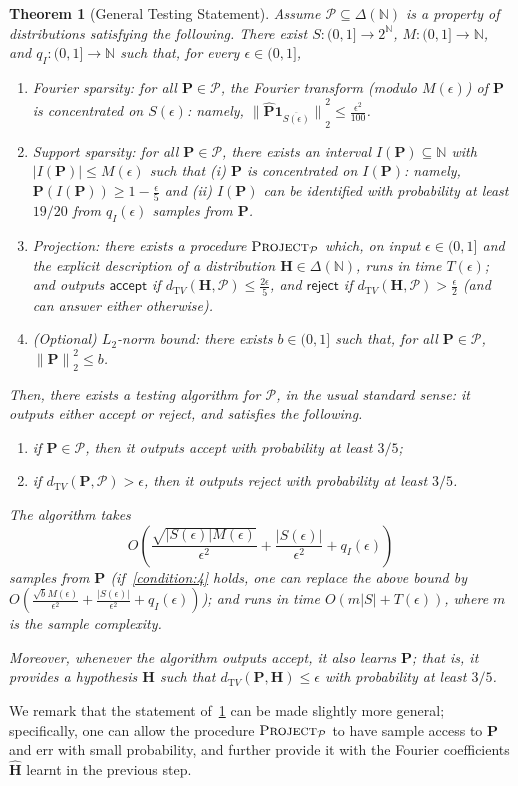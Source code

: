 \documentclass[11pt]{article}
\newtheorem{theorem}{Theorem}[section]
\theoremstyle{definition}
\newcommand{\N}{\mathbb{N}}
\newcommand{\p}{\mathbf{P}}
\newcommand{\h}{\mathbf{H}}
\newcommand{\dtv}{d_{\mathrm TV}}
\newcommand{\eps}{\epsilon}
\newcommand{\abs}[1]{\lvert#1\rvert}
\newcommand{\norm}[1]{\lVert#1\rVert}
\newcommand{\distribs}[1]{\Delta\!\left(#1\right)} \newcommand{\normone}[1]{{\norm{#1}}_1}
\newcommand{\normtwo}[1]{{\norm{#1}}_2}
\renewcommand{\abs}[1]{\left\lvert #1 \right\rvert}
\newcommand{\accept}{\textsf{accept}\xspace}
\newcommand{\reject}{\textsf{reject}\xspace}
\newcommand{\bigO}[1]{{O\left( #1 \right)}}
\newcommand{\fourier}[1]{\widehat{#1}}
\begin{document}
\begin{theorem}[General Testing Statement]\label{theo:testing:general}
Assume $\mathcal{P}\subseteq \distribs{\N}$ is a property of distributions satisfying the following. There exist $S\colon(0,1]\to 2^{\N}$, $M\colon (0,1]\to\N$, and $q_I\colon (0,1]\to\N$ such that, for every $\eps\in(0,1]$,
\begin{enumerate}
  \item\label{condition:1} \textsf{Fourier sparsity:} for all $\p\in\mathcal{P}$, the Fourier transform (modulo $M(\eps)$) of $\p$ is concentrated on $S(\eps)$: namely,
  $
      \normtwo{\fourier{\p}\mathbf{1}_{\overline{S(\eps)}}}^2 \leq \frac{\eps^2}{100}
  $.
  \item\label{condition:2} \textsf{Support sparsity:} for all $\p\in\mathcal{P}$, there exists an interval $I(\p)\subseteq \N$ with $\abs{I(\p)} \leq M(\eps)$ such that (i) $\p$ is concentrated on $I(\p)$: namely,
  $
      \p(I(\p)) \geq 1-\frac{\eps}{5}
  $ and (ii) $I(\p)$ can be identified with probability at least $19/20$ from $q_I(\eps)$ samples from $\p$.
  \item\label{condition:3} \textsf{Projection:} there exists a procedure $\textsc{Project}_{\mathcal{P}}$ which, on input $\eps\in(0,1]$ and the explicit description of a distribution $\h\in\distribs{\N}$, runs in time $T(\eps)$; and outputs $\accept$ if $\dtv(\h,\mathcal{P})\leq \frac{2\eps}{5}$, and $\reject$ if $\dtv(\h,\mathcal{P}) > \frac{\eps}{2}$ (and can answer either otherwise).
  \item\label{condition:4} \textsf{(Optional) $L_2$-norm bound:} there exists $b\in(0,1]$ such that, for all $\p\in\mathcal{P}$, $\normtwo{\p}^2 \leq b$.
\end{enumerate}
Then, there exists a testing algorithm for $\mathcal{P}$, in the usual standard sense: it outputs either \accept or \reject, and satisfies the following.
    \begin{enumerate}
        \item if $\p \in \mathcal{P}$, then it outputs \accept with probability at least $3/5$;
        \item if $\dtv(\p,\mathcal{P}) > \eps$, then it outputs \reject with probability at least $3/5$.
    \end{enumerate}
The algorithm takes 
\[
    \bigO{ \frac{\sqrt{\abs{S(\eps)}M(\eps)}}{\eps^2} + \frac{\abs{S(\eps)}}{\eps^2} + q_I(\eps)  }
\] samples from $\p$ (if~\cref{condition:4} holds, one can replace the above bound by
$
    \bigO{ \frac{\sqrt{b}M(\eps)}{\eps^2} + \frac{\abs{S(\eps)}}{\eps^2} + q_I(\eps)  }
$); and runs in time $\bigO{m\abs{S} + T(\eps)}$, where $m$ is the sample complexity.

Moreover, whenever the algorithm outputs \accept, it also \emph{learns} $\p$; that is, it provides a hypothesis $\h$ such that $\dtv(\p,\h) \leq \eps$ with probability at least $3/5$.
\end{theorem}
We remark that the statement of~\cref{theo:testing:general} can be made slightly more general; specifically, one can allow the procedure $\textsc{Project}_{\mathcal{P}}$ to have sample access to $\p$ and err with small probability, and further provide it with the Fourier coefficients $\fourier{\h}$ learnt in the previous step.
\end{document}
